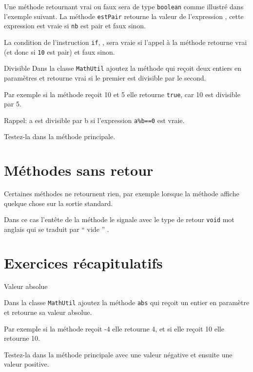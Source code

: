 \documentclass[a4paper,11pt]{article}
\begin{document}
	Une méthode retournant vrai ou faux sera de type \texttt{boolean} comme illustré dans l'exemple suivant.
	La méthode \texttt{estPair} retourne la valeur de l'expression , 
	cette expression est vraie si \texttt{nb} est pair et faux sinon.
	
	La condition de l'instruction \texttt{if}, , sera vraie si l'appel à la méthode retourne vrai (et donc si \texttt{10} est pair)
	 et faux sinon.

	 \begin{Exercice}{Divisible}
		Dans la classe \texttt{MathUtil} ajoutez la méthode 
		 qui reçoit deux entiers en paramètres et 
		retourne vrai si le premier est divisible par le second.
		
		Par exemple si la méthode reçoit 10 et 5 elle retourne \texttt{true}, car 10 est divisible par 5.
		
		Rappel: a est divisible par b si l'expression \texttt{a\%b==0} est vraie.
		
		Testez-la dans la méthode principale.
	\end{Exercice} 

\section{Méthodes sans retour}
	
	Certaines méthodes ne retournent rien,
	par exemple lorsque la méthode affiche quelque chose sur la sortie standard.

	Dans ce cas l'entête de la méthode le signale avec le type de retour \texttt{void}
	mot anglais qui se traduit par `` vide '' .
	
	

	
\section{Exercices récapitulatifs}
				
	 \begin{Exercice}{Valeur absolue}
		
		Dans la classe \texttt{MathUtil} ajoutez la méthode 
		\texttt{abs} qui reçoit un entier en paramètre et retourne sa valeur absolue.
		
		Par exemple si la méthode reçoit -4 elle retourne 4, et si elle reçoit 10 elle retourne 10.
		
		Testez-la dans la méthode principale avec une valeur négative et ensuite une valeur positive.
		
	\end{Exercice} 
					
\end{document}
